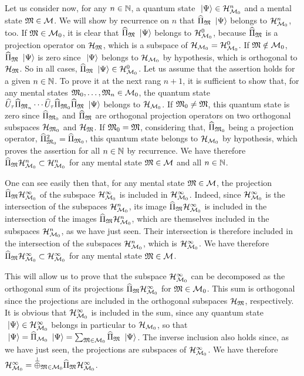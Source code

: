  Let us consider now, for any $n \in \mathbb{N}$,  a quantum state $\ \left|{\Psi}\right\rangle \in \mathcal H_{\mathcal M_0}^n$ and a mental state $\mathfrak{M} \in \mathcal M$. We will show by recurrence on $n$ that $\widehat{\Pi}_{\mathfrak{M}} \ \left|{\Psi}\right\rangle$ belongs to $\mathcal H_{\mathcal M_0}^n$, too. If $\mathfrak{M} \in \mathcal M_0$, it is clear that $\widehat{\Pi}_{\mathfrak{M}} \ \left|{\Psi}\right\rangle$ belongs to $\mathcal H_{\mathcal M_0}^0$, because $\widehat{\Pi}_{\mathfrak{M}}$ is a projection operator on $\mathcal H_{\mathfrak{M}}$, which is a subspace of $\mathcal H_{\mathcal M_0} = \mathcal H_{\mathcal M_0}^0$. If $\mathfrak{M} \notin \mathcal M_0$, $\widehat{\Pi}_{\mathfrak{M}} \ \left|{\Psi}\right\rangle$ is zero since $\ \left|{\Psi}\right\rangle$ belongs to $\mathcal H_{\mathcal M_0}$ by hypothesis, which is orthogonal to $\mathcal H_{\mathfrak{M}}$. So in all cases, $\widehat{\Pi}_{\mathfrak{M}} \ \left|{\Psi}\right\rangle \in \mathcal H_{\mathcal M_0}^0$. Let us assume that the assertion holds for a given $n \in \mathbb{N}$. To prove it at the next rang $n + 1$, it is sufficient to show that, for any mental states $\mathfrak{M}_0, \dotsc, \mathfrak{M}_n \in \mathcal M_0$, the quantum state $\widehat{U}_\tau \widehat{\Pi}_{\mathfrak{M}_n} \dotsm \widehat{U}_\tau \widehat{\Pi}_{\mathfrak{M}_0} \widehat{\Pi}_{\mathfrak{M}} \ \left|{\Psi}\right\rangle$ belongs to $\mathcal H_{\mathcal M_0}$. If $\mathfrak{M}_0 \neq \mathfrak{M}$, this quantum state is zero since $\widehat{\Pi}_{\mathfrak{M}_0}$ and $\widehat{\Pi}_{\mathfrak{M}}$ are orthogonal projection operators on two orthogonal subspaces $\mathcal H_{\mathfrak{M}_0}$ and $\mathcal H_{\mathfrak{M}}$. If $\mathfrak{M}_0 = \mathfrak{M}$, considering that, $\widehat{\Pi}_{\mathfrak{M}_0}$ being a projection operator, $\widehat{\Pi}_{\mathfrak{M}_0}^2 = \widehat{\Pi}_{\mathfrak{M}_0}$, this quantum state belongs to $\mathcal H_{\mathcal M_0}$ by hypothesis, which proves the assertion for all $n \in \mathbb{N}$ by recurrence. We have therefore $\widehat{\Pi}_{\mathfrak{M}} \mathcal H_{\mathcal M_0}^n \subset \mathcal H_{\mathcal M_0}^n$ for any mental state $\mathfrak{M} \in \mathcal M$ and all $n \in \mathbb{N}$.

 One can see easily then that, for any mental state $\mathfrak{M} \in \mathcal M$, the projection $\widehat{\Pi}_{\mathfrak{M}} \mathcal H_{\mathcal M_0}^\infty$ of the subspace $\mathcal H_{\mathcal M_0}^\infty$ is included in $\mathcal H_{\mathcal M_0}^\infty$. Indeed, since $\mathcal H_{\mathcal M_0}^\infty$ is the intersection of the subspaces $\mathcal H_{\mathcal M_0}^n$, its image $\widehat{\Pi}_{\mathfrak{M}} \mathcal H_{\mathcal M_0}^\infty$ is included in the intersection of the images $\widehat{\Pi}_{\mathfrak{M}} \mathcal H_{\mathcal M_0}^n$, which are themselves included in the subspaces $\mathcal H_{\mathcal M_0}^n$, as we have just seen. Their intersection is therefore included in the intersection of the subspaces $\mathcal H_{\mathcal M_0}^n$, which is $\mathcal H_{\mathcal M_0}^\infty$. We have therefore $\widehat{\Pi}_{\mathfrak{M}} \mathcal H_{\mathcal M_0}^\infty \subset \mathcal H_{\mathcal M_0}^\infty$ for any mental state $\mathfrak{M} \in \mathcal M$.

 This will allow us to prove that the subspace $\mathcal H_{\mathcal M_0}^\infty$ can be decomposed as the orthogonal sum of its projections $\widehat{\Pi}_{\mathfrak{M}} \mathcal H_{\mathcal M_0}^\infty$ for $\mathfrak{M} \in \mathcal M_0$. This sum is orthogonal since the projections are included in the orthogonal subspaces $\mathcal H_{\mathfrak{M}}$, respectively. It is obvious that $\mathcal H_{\mathcal M_0}^\infty$ is included in the sum, since any quantum state $\ \left|{\Psi}\right\rangle \in \mathcal H_{\mathcal M_0}^\infty$ belongs in particular to $\mathcal H_{\mathcal M_0}$, so that $\ \left|{\Psi}\right\rangle = \widehat{\Pi}_{\mathcal M_0} \ \left|{\Psi}\right\rangle = \sum_{\mathfrak{M} \in \mathcal M_0} \widehat{\Pi}_{\mathfrak{M}} \ \left|{\Psi}\right\rangle$. The inverse inclusion also holds since, as we have just seen, the projections are subspaces of $\mathcal H_{\mathcal M_0}^\infty$. We have therefore $\mathcal H_{\mathcal M_0}^\infty = \overset{\perp}{\oplus}_{\mathfrak{M} \in \mathcal M_0} \widehat{\Pi}_{\mathfrak{M}} \mathcal H_{\mathcal M_0}^\infty$.

